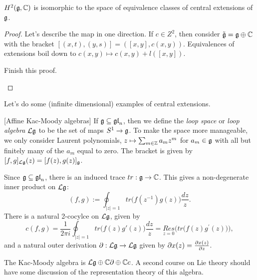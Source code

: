  \begin{theorem} \label{lec10ThmCextns}
 $H^{2}(\mathfrak{g},\mathbb{C})$ is isomorphic to the space of equivalence classes of central
 extensions of $\mathfrak{g}$.
 \end{theorem}

 \begin{proof}
 Let's describe the map in one direction. If $c\in Z^{2}$, then consider $\tilde{\mathfrak{g}} =
 \mathfrak{g}\oplus\mathbb{C}$ with the bracket $[(x,t),(y,s)] = ([x,y],c(x,y))$. Equivalences of
 extensions boil down to $c(x,y)\mapsto c(x,y)+l([x,y])$.
 \begin{exercise}
   Finish this proof. 
 \end{exercise}
 \end{proof}
 Let's do some (infinite dimensional) examples of central extensions.
 \begin{example}
 [Affine Kac-Moody algebras] If $\mathfrak{g}\subseteq \mathfrak{gl}_n$, then we
 define the \emph{loop space} or \emph{loop
 algebra} $\mathcal{L}\mathfrak{g}$ to be the set of maps $S^1\to \mathfrak{g}$. To
 make the space more manageable, we only consider Laurent polynomials, $z\mapsto
 \sum_{m\in \mathbb{Z}}a_m z^m$ for $a_m\in \mathfrak{g}$ with all but finitely many of the $a_m$ equal
 to zero. The bracket is given by $[f,g]_{\mathcal{L}\mathfrak{g}}(z)=[f(z),g(z)]_{\mathfrak{g}}$.

 Since $\mathfrak{g}\subseteq \mathfrak{gl}_n$, there is an induced trace $tr:\mathfrak{g}\to \mathbb{C}$. This gives a
 non-degenerate inner product on $\mathcal{L}\mathfrak{g}$:
 \[
    (f,g):= \oint_{|z|=1} tr\bigl(f(z^{-1})g(z)\bigr) \frac{dz}{z}.
 \]
 There is a natural 2-cocylce on $\mathcal{L}\mathfrak{g}$, given by
 \[
    c(f,g) = \frac{1}{2\pi i} \oint_{|z|=1} tr\bigl(f(z)g'(z)\bigr) \frac{dz}{z} =
           \underset{z=0}{Res}\biggl(tr\bigl(f(z)g^{\prime}(z)\bigr)\biggr),
 \]
 and a natural outer derivation $\partial: \mathcal{L}\mathfrak{g}\to \mathcal{L}\mathfrak{g}$ given by
 $\partial x(z) = \frac{\partial x(z)}{\partial z}$.

 The Kac-Moody algebra  is
 $\mathcal{L}\mathfrak{g}\oplus \mathbb{C} \partial\oplus \mathbb{C} c$. A second course on Lie theory should
 have some discussion of the representation theory of this algebra.
 \end{example}

